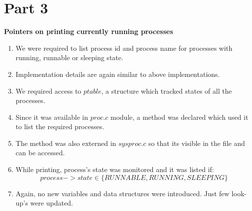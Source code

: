 \documentclass{article}
\newcommand{\bld}[1]{\textbf{#1}}
\begin{document}
\section*{Part 3}
\bld{Pointers on printing currently running processes}
\begin{enumerate}
	\item We were required to list process id and process name for processes with running, runnable or sleeping state.
	\item Implementation details are again similar to above implementations.
	\item We required access to $ptable$, a structure which tracked states of all the processes. 
	\item Since it was available in $proc.c$ module, a method was declared which used it to list the required processes.
	\item The method was also externed in $sysproc.c$ so that its visible in the file and can be accessed.
	\item While printing, process's state was monitored and it was listed if: $$process->state \in \{RUNNABLE,RUNNING,SLEEPING\}$$
	\item Again, no new variables and data structures were introduced. Just few look-up's were updated.
\end{enumerate}
\end{document}

